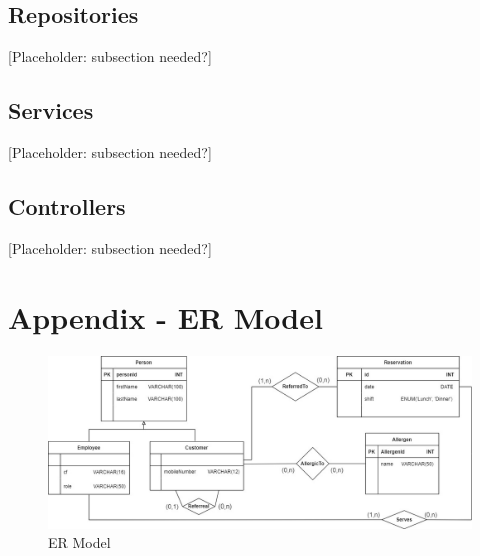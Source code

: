 \documentclass{article}
\begin{document}
\subsection*{Repositories}
[Placeholder: subsection needed?]

\subsection*{Services}
[Placeholder: subsection needed?]

\subsection*{Controllers}
[Placeholder: subsection needed?]


\newpage
\appendix

\section*{Appendix - ER Model}
\label{appendix:A}
\begin{figure}[H]
    \centering
    \includegraphics[width=\textwidth]{ER}
    \caption{ER Model}
    \label{fig:ermodel}
\end{figure}
\end{document}
